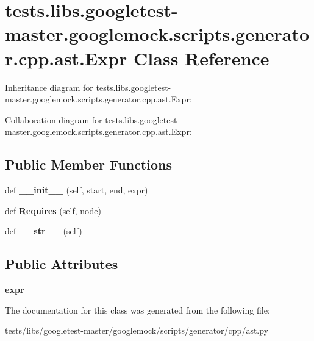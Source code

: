 \hypertarget{classtests_1_1libs_1_1googletest-master_1_1googlemock_1_1scripts_1_1generator_1_1cpp_1_1ast_1_1Expr}{}\section{tests.\+libs.\+googletest-\/master.googlemock.\+scripts.\+generator.\+cpp.\+ast.\+Expr Class Reference}
\label{classtests_1_1libs_1_1googletest-master_1_1googlemock_1_1scripts_1_1generator_1_1cpp_1_1ast_1_1Expr}


Inheritance diagram for tests.\+libs.\+googletest-\/master.googlemock.\+scripts.\+generator.\+cpp.\+ast.\+Expr\+:


Collaboration diagram for tests.\+libs.\+googletest-\/master.googlemock.\+scripts.\+generator.\+cpp.\+ast.\+Expr\+:
\subsection*{Public Member Functions}
\begin{DoxyCompactItemize}
\item 
\mbox{\label{classtests_1_1libs_1_1googletest-master_1_1googlemock_1_1scripts_1_1generator_1_1cpp_1_1ast_1_1Expr_a3c433c43e223efa5ac1405ecb1349695}} 
def {\bfseries \+\_\+\+\_\+init\+\_\+\+\_\+} (self, start, end, expr)
\item 
\mbox{\label{classtests_1_1libs_1_1googletest-master_1_1googlemock_1_1scripts_1_1generator_1_1cpp_1_1ast_1_1Expr_a1ebe9bc4e5079dbd071352964b26ede8}} 
def {\bfseries Requires} (self, node)
\item 
\mbox{\label{classtests_1_1libs_1_1googletest-master_1_1googlemock_1_1scripts_1_1generator_1_1cpp_1_1ast_1_1Expr_a814f9401852d0d0273992c8c42ced067}} 
def {\bfseries \+\_\+\+\_\+str\+\_\+\+\_\+} (self)
\end{DoxyCompactItemize}
\subsection*{Public Attributes}
\begin{DoxyCompactItemize}
\item 
\mbox{\label{classtests_1_1libs_1_1googletest-master_1_1googlemock_1_1scripts_1_1generator_1_1cpp_1_1ast_1_1Expr_af714d7395866eb4d76412960a91a0b4e}} 
{\bfseries expr}
\end{DoxyCompactItemize}


The documentation for this class was generated from the following file\+:\begin{DoxyCompactItemize}
\item 
tests/libs/googletest-\/master/googlemock/scripts/generator/cpp/ast.\+py\end{DoxyCompactItemize}
